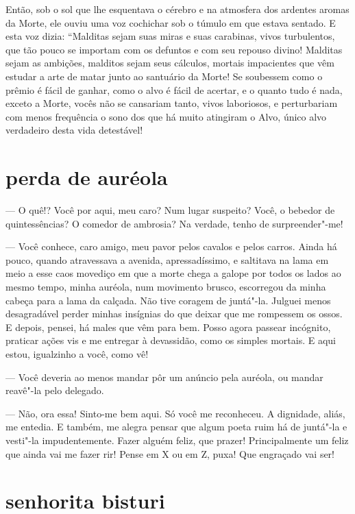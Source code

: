 Então, sob o sol que lhe esquentava o cérebro e na atmosfera dos
ardentes aromas da Morte, ele ouviu uma voz cochichar sob o túmulo em
que estava sentado. E esta voz dizia: ``Malditas sejam
suas miras e suas carabinas, vivos turbulentos, que tão
pouco se importam com os defuntos e com seu repouso divino! Malditas sejam as
ambições, malditos sejam seus cálculos, mortais impacientes que vêm
estudar a arte de matar junto ao santuário da Morte! Se soubessem
como o prêmio é fácil de ganhar, como o alvo é fácil de acertar, e o
quanto tudo é nada, exceto a Morte, vocês não se cansariam tanto, vivos
laboriosos, e perturbariam com menos frequência o sono dos que há
muito atingiram o Alvo, único alvo verdadeiro desta vida detestável!

\quebra\section[A perda de auréola]{perda de auréola}

--- O quê!? Você por aqui, meu caro? Num lugar suspeito?
Você, o bebedor de quintessências? O comedor de ambrosia? Na
verdade, tenho de surpreender"-me!

--- Você conhece, caro amigo, meu pavor pelos cavalos e pelos carros. Ainda
há pouco, quando atravessava a avenida, apressadíssimo, e
saltitava na lama em meio a esse caos movediço em que a morte chega a
galope por todos os lados ao mesmo tempo, minha auréola, num movimento
brusco, escorregou da minha cabeça para a lama da calçada. Não tive
coragem de juntá"-la. Julguei menos desagradável perder minhas
insígnias do que deixar que me rompessem os ossos. E depois, pensei, há
males que vêm para bem. Posso agora passear incógnito, praticar ações
vis e me entregar à devassidão, como os simples mortais. E 
aqui estou, igualzinho a você, como vê!

--- Você deveria ao menos mandar pôr um anúncio pela auréola, ou mandar
reavê"-la pelo delegado.

--- Não, ora essa! Sinto-me bem aqui. Só você me reconheceu. A dignidade, aliás, me entedia. E também, me alegra pensar que algum poeta ruim
há de juntá"-la e vesti"-la impudentemente. Fazer alguém feliz, que
prazer! Principalmente um feliz que ainda vai me fazer rir! Pense em X ou em
Z, puxa! Que engraçado vai ser!

\quebra\section[Senhorita bisturi]{senhorita bisturi}

